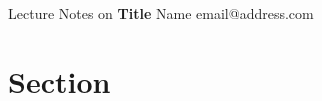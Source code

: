 \documentclass[11pt]{article}
\begin{document}
\thispagestyle{empty}
\bigskip \
\vspace{0.1cm}

\begin{center}
    {\fontsize{22}{22} \selectfont Lecture Notes on}
    \vskip 16pt
        {\fontsize{36}{36} \selectfont \bf \sffamily Title}
    \vskip 24pt
        {\fontsize{18}{18} \selectfont \rmfamily Name}
    \vskip 6pt
        {\fontsize{14}{14} \selectfont \ttfamily email@address.com}
    \vskip 24pt
\end{center}

{\parindent0pt \baselineskip=15.5pt \lipsum[1-4]}

\newpage
\microtoc
\newpage

\section{Section}
\lipsum[1-4]
\end{document}
